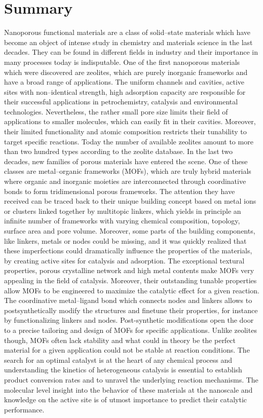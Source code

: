 \chapter{Summary}
Nanoporous functional materials are a class of solid--state materials which have
become an object of intense study in chemistry and materials science in the last decades. They can be found in different fields in industry and their importance in many processes today is indisputable.
\npar
One of the first nanoporous materials which were discovered are zeolites, which
are purely inorganic frameworks and have a broad range of applications. The
uniform channels and cavities, active sites with non--identical strength, high
adsorption capacity are responsible for their successful applications in
petrochemistry, catalysis and environmental technologies. Nevertheless, the
rather small pore size limits their field of applications to smaller molecules,
which can easily fit in their cavities. Moreover, their limited functionality
and atomic composition restricts their tunability to target specific reactions.
Today the number of available zeolites amount to more than two hundred types
according to the zeolite database. In the last two decades, new families of
porous materials have entered the scene. One of these classes are
metal--organic frameworks (MOFs), which are truly hybrid materials where organic
and inorganic moieties are interconnected through coordinative bonds to form
tridimensional porous frameworks. The attention they have received can be traced
back to their unique building concept based on metal ions or clusters linked
together by multitopic linkers, which yields in principle an infinite number of
frameworks with varying chemical composition, topology, surface area and pore
volume.
Moreover, some parts of the building components, like linkers, metals or nodes could be missing, and it was quickly realized that these imperfections could dramatically influence the properties of the materials, by creating active sites for catalysis and adsorption.
\npar
The exceptional textural properties, porous crystalline network and high metal
contents make MOFs very appealing in the field of catalysis. Moreover, their
outstanding tunable properties allow MOFs to be engineered to maximize the
catalytic effect for a given reaction. The coordinative metal--ligand bond which connects nodes and linkers allows to postsynthetically modify the structures and finetune their properties, for instance by functionalizing linkers and nodes. Post-synthetic modifications open the door to a precise tailoring and design of MOFs for specific applications. Unlike zeolites though, MOFs often lack stability and what could in theory be the perfect material for a given application could not be stable at reaction conditions. The search for an optimal catalyst is at the heart of any chemical process and understanding the kinetics of heterogeneous catalysis is essential to establish product conversion rates and to unravel the underlying reaction mechanisms. The molecular level insight into the behavior of these materials at the nanoscale and knowledge on the active site is of utmost importance to predict their catalytic performance.
